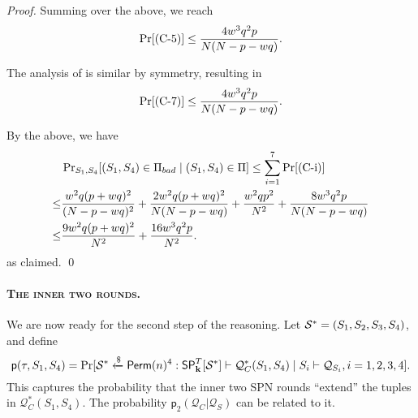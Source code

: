 \begin{proof}
Summing over the above, we reach
%
$$\Pr[\text{(C-5)}]\leq\frac{4w^3q^2p}{N(N-p-wq)}.$$
%

The analysis of \cseven is similar by symmetry, resulting in
%
%
$$\Pr[\text{(C-7)}]\leq\frac{4w^3q^2p}{N(N-p-wq)}.$$
%



\arrangespace


By the above, we have
%
\begin{align*}
&  \operatorname{Pr}_{S_1,S_4}[(S_1,S_4) \in \emph{$\Pi_{bad}$}\mid (S_{1}, S_{4})\in\Pi]  \leq \sum_{i=1}^7\Pr[\text{(C-i)}]       \\
\leq  & \frac{w^2 q (p+w q)^{2}}{(N-p-wq)^{2}}+
\frac{2w^2 q (p+w q)^{2}}{N  (N-p-wq)}+
\frac{w^2qp^2}{N^2}+
\frac{8w^3q^2p}{N(N-p-wq)}      \\
\leq  & \frac{9w^2 q (p+w q)^{2}}{N^2}+ \frac{16w^3q^2p}{N^2} .
\end{align*}
%
as claimed.       \qed
\end{proof}





\paragraph{\textsc{The inner two rounds.}}


We are now ready for the second step of the reasoning. Let
$\mathcal{S}^*=(S_1,S_2,S_3,S_4)$, and define     {\small
	$$\textsf{p}(\tau,S_1,S_4)=\Pr[\mathcal{S}^*\xleftarrow{\$}\mathsf{Perm}(n)^4:\mathsf{SP}_{\mathbf{k}}^T[\mathcal{S}^*]\vdash\mathcal{Q}_C^*(S_1,S_4)
	\mid S_i\vdash\mathcal{Q}_{S_i},i=1,2,3,4].$$
}%
This captures the probability that the inner two SPN rounds ``extend'' the tuples in $\mathcal{Q}_C^*(S_1,S_4)$. The probability
$\mathsf{p}_{2}\left(\mathcal{Q}_{C} | \mathcal{Q}_{S}\right)$ can be related to it.


